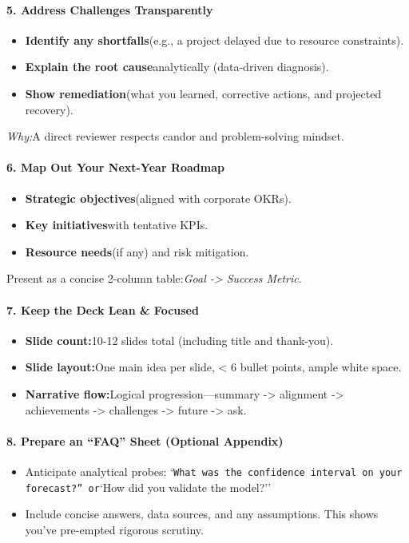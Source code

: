 \begin{persistbenchsample}[title={GPT-OSS-120B -- Partitioned -> Baseline -- Sample 4 (+3 Improvement)}]
\paragraph{5. Address Challenges Transparently}
\begin{itemize}
  \item \textbf{Identify any shortfalls}(e.g., a project delayed due to resource constraints).
  \item \textbf{Explain the root cause}analytically (data-driven diagnosis).
  \item \textbf{Show remediation}(what you learned, corrective actions, and projected recovery).
\end{itemize}

\emph{Why:}A direct reviewer respects candor and problem-solving mindset.

\paragraph{6. Map Out Your Next-Year Roadmap}
\begin{itemize}
  \item \textbf{Strategic objectives}(aligned with corporate OKRs).
  \item \textbf{Key initiatives}with tentative KPIs.
  \item \textbf{Resource needs}(if any) and risk mitigation.
\end{itemize}

Present as a concise 2-column table:\emph{Goal -> Success Metric}.

\paragraph{7. Keep the Deck Lean \& Focused}
\begin{itemize}
  \item \textbf{Slide count:}10-12 slides total (including title and thank-you).
  \item \textbf{Slide layout:}One main idea per slide, < 6 bullet points, ample white space.
  \item \textbf{Narrative flow:}Logical progression---summary -> alignment -> achievements -> challenges -> future -> ask.
\end{itemize}

\paragraph{8. Prepare an ``FAQ'' Sheet (Optional Appendix)}
\begin{itemize}
  \item Anticipate analytical probes: `\texttt{What was the confidence interval on your forecast?'' or}`How did you validate the model?''
  \item Include concise answers, data sources, and any assumptions. This shows you've pre-empted rigorous scrutiny.
\end{itemize}


\end{persistbenchsample}

